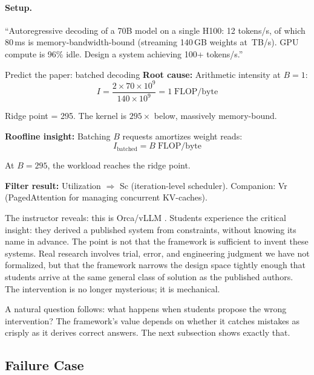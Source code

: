 \documentclass[10pt,twocolumn]{article}
\newcommand{\cval}[1]{\pgfmathprintnumber[fixed, precision=1, 1000 sep={\,}]{#1}}
\begin{document}
\paragraph{Setup.} ``Autoregressive decoding of a 70B model on a single H100: 12 tokens/s, of which 80\,ms is memory-bandwidth-bound (streaming 140\,GB weights at \cval{\HhBWTBs}\,TB/s). GPU compute is 96\% idle. Design a system achieving 100+ tokens/s.''

\begin{napkinmath}{Predict the paper: batched decoding}
\textbf{Root cause:} Arithmetic intensity at $B = 1$:
\[
I = \frac{2 \times 70 \times 10^9}{140 \times 10^9} = 1\;\text{FLOP/byte}
\]

Ridge point = 295. The kernel is $295\times$ below, massively memory-bound.

\textbf{Roofline insight:} Batching $B$ requests amortizes weight reads:
\[
I_{\text{batched}} = B \;\text{FLOP/byte}
\]

At $B = 295$, the workload reaches the ridge point.

\textbf{Filter result:} Utilization $\Rightarrow$ Sc (iteration-level scheduler). Companion: Vr (PagedAttention for managing concurrent KV-caches).
\end{napkinmath}

The instructor reveals: this is Orca/vLLM \citep{yu2022orca, kwon2023}. Students experience the critical insight: they derived a published system from constraints, without knowing its name in advance. The point is not that the framework is sufficient to invent these systems. Real research involves trial, error, and engineering judgment we have not formalized, but that the framework narrows the design space tightly enough that students arrive at the same general class of solution as the published authors. The intervention is no longer mysterious; it is mechanical.

A natural question follows: what happens when students propose the wrong intervention? The framework's value depends on whether it catches mistakes as crisply as it derives correct answers. The next subsection shows exactly that.

\subsection{Failure Case}
\label{sec:failure-case}
\end{document}

